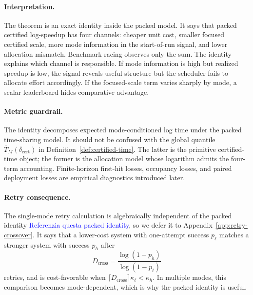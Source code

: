 \documentclass{article}
\begin{document}
\paragraph{Interpretation.}
The theorem is an exact identity inside the packed model.  It says that packed certified
log-speedup has four channels: cheaper unit cost, smaller focused certified scale, more
mode information in the start-of-run signal, and lower allocation mismatch.  Benchmark
racing observes only the sum.  The identity explains which channel is responsible.  If mode
information is high but realized speedup is low, the signal reveals useful structure but the
scheduler fails to allocate effort accordingly.  If the focused-scale term varies sharply by
mode, a scalar leaderboard hides comparative advantage.

\paragraph{Metric guardrail.}
The identity decomposes expected mode-conditioned log time under the packed time-sharing
model.  It should not be confused with the global quantile
\(\overline T_M(\delta_{\mathrm{cert}})\) in Definition~\ref{def:certified-time}.  The latter is the
primitive certified-time object; the former is the allocation model whose logarithm admits
the four-term accounting.  Finite-horizon first-hit losses, occupancy losses, and paired
deployment losses are empirical diagnostics introduced later.


\paragraph{Retry consequence.}
The single-mode retry calculation is algebraically independent of the packed identity \textcolor{blue}{Referenzia questa packed identity}, so we defer it to Appendix~\ref{app:retry-crossover}.  It says that a lower-cost system with one-attempt success \(p_\ell\) matches a stronger system with success \(p_h\) after
\[
    D_{\mathrm{cross}}=\frac{\log(1-p_h)}{\log(1-p_\ell)}
\]
retries, and is cost-favorable when \(\lceil D_{\mathrm{cross}}\rceil\kappa_\ell<\kappa_h\).  In multiple modes, this comparison becomes mode-dependent, which is why the packed identity is useful.

\end{document}
